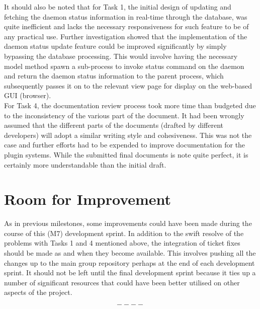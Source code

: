 \documentclass{article}
\begin{document}
It should also be noted that for Task 1, the initial design of updating and fetching the daemon status information in real-time through the database, was quite inefficient and lacks the necessary responsiveness for such feature to be of any practical use. Further investigation showed that the implementation of the daemon status update feature could be improved significantly by simply bypassing the database processing. This would involve having the necessary model method spawn a sub-process to invoke status command on the daemon and return the daemon status information to the parent process, which subsequently passes it on to the relevant view page for display on the web-based GUI (browser). \\

For Task 4, the documentation review process took more time than budgeted due to the inconsistency of the various part of the document. It had been wrongly assumed that the different parts of the documents (drafted by different developers) will adopt a similar writing style and cohesiveness. This was not the case and further efforts had to be expended to improve documentation for the plugin systems. While the submitted final documents is note quite perfect, it is certainly more understandable than the initial draft.


\section*{Room for Improvement}

As in previous milestones, some improvements could have been made during the course of this (M7) development sprint. In addition to the swift resolve of the problems with Tasks 1 and 4 mentioned above, the integration of ticket fixes should be made as and when they become available. This involves pushing all the changes up to the main group repository perhaps at the end of each development sprint. It should not be left until the final development sprint because it ties up a number of significant resources that could have been better utilised on other aspects of the project.

\[----\]
\end{document}

